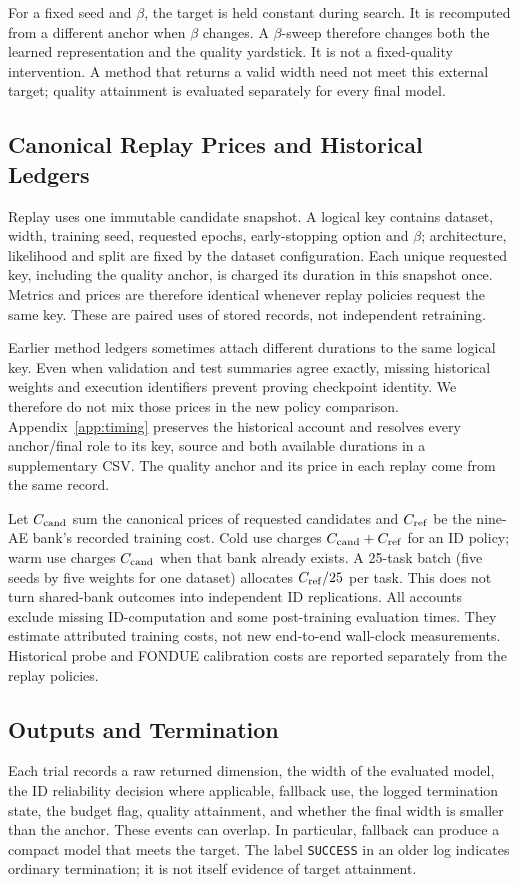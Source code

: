 \documentclass[make,article,submit,pdftex,moreauthors]{Definitions/mdpi}
\begin{document}
For a fixed seed and $\beta$, the target is held constant during search.
It is recomputed from a different anchor when $\beta$ changes. A
$\beta$-sweep therefore changes both the learned representation and the
quality yardstick. It is not a fixed-quality intervention. A method that
returns a valid width need not meet this external target; quality
attainment is evaluated separately for every final model.

\subsection{Canonical Replay Prices and Historical Ledgers}\label{sec:cost}
Replay uses one immutable candidate snapshot. A logical key contains
dataset, width, training seed, requested epochs, early-stopping option and
$\beta$; architecture, likelihood and split are fixed by the dataset
configuration. Each unique requested key, including the quality anchor,
is charged its duration in this snapshot once. Metrics and prices are
therefore identical whenever replay policies request the same key.
These are paired uses of stored records, not independent retraining.

Earlier method ledgers sometimes attach different durations to the same
logical key. Even when validation and test summaries agree exactly,
missing historical weights and execution identifiers prevent proving
checkpoint identity. We therefore do not mix those prices in the new
policy comparison. Appendix~\ref{app:timing} preserves the historical
account and resolves every anchor/final role to its key, source and both
available durations in a supplementary CSV. The quality anchor and its
price in each replay come from the same record.

Let $C_{\rm cand}$ sum the canonical prices of requested candidates and
$C_{\rm ref}$ be the nine-AE bank's recorded training cost.
Cold use charges $C_{\rm cand}+C_{\rm ref}$ for an ID policy; warm use
charges $C_{\rm cand}$ when that bank already exists. A 25-task batch
(five seeds by five weights for one dataset) allocates $C_{\rm ref}/25$
per task. This does not turn shared-bank outcomes into independent ID
replications. All accounts exclude missing ID-computation and some
post-training evaluation times. They estimate attributed training costs,
not new end-to-end wall-clock measurements. Historical probe and FONDUE
calibration costs are reported separately from the replay policies.

\subsection{Outputs and Termination}\label{sec:outcomes}
Each trial records a raw returned dimension, the width of the evaluated
model, the ID reliability decision where applicable, fallback use, the
logged termination state, the budget flag, quality attainment, and whether
the final width is smaller than the anchor. These events can overlap.
In particular, fallback can produce a compact model that meets the target.
The label \texttt{SUCCESS} in an older log indicates ordinary termination;
it is not itself evidence of target attainment.
\end{document}
